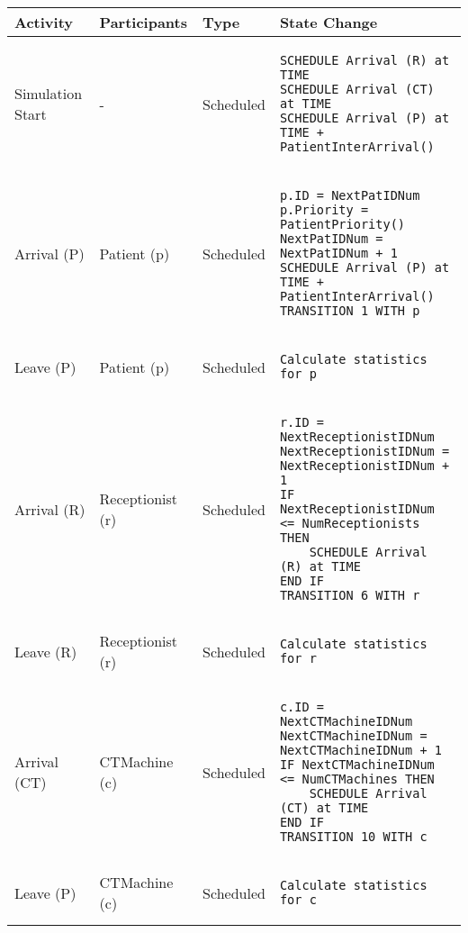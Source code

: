 \begin{tabular}{@{}>{\raggedright\arraybackslash}p{1.5cm}>{\raggedright\arraybackslash}p{2.1cm}>{\raggedright\arraybackslash}p{2.2cm}>{\raggedright\arraybackslash}p{10cm}@{}}
  \toprule
  Activity          & Participants & Type       & State Change \\ \midrule
  Simulation Start & -  & Scheduled  & 
  \vspace{-12pt}
  \begin{lstlisting}[language=CMPseudo]
SCHEDULE Arrival (R) at TIME
SCHEDULE Arrival (CT) at TIME
SCHEDULE Arrival (P) at TIME + PatientInterArrival()
  \end{lstlisting}
  \\ \midrule
  Arrival (P) & Patient (p)  & Scheduled  & 
  \vspace{-12pt}
  \begin{lstlisting}[language=CMPseudo]
p.ID = NextPatIDNum
p.Priority = PatientPriority()
NextPatIDNum = NextPatIDNum + 1
SCHEDULE Arrival (P) at TIME + PatientInterArrival()
TRANSITION 1 WITH p
  \end{lstlisting}
  \\ \midrule
  Leave (P) & Patient (p)  & Scheduled  & 
  \vspace{-12pt}
  \begin{lstlisting}[language=CMPseudo]
Calculate statistics for p
  \end{lstlisting}
  \\ \midrule
  Arrival (R) & Receptionist (r)  & Scheduled  & 
  \vspace{-12pt}
  \begin{lstlisting}[language=CMPseudo]
r.ID = NextReceptionistIDNum
NextReceptionistIDNum = NextReceptionistIDNum + 1
IF NextReceptionistIDNum <= NumReceptionists THEN
    SCHEDULE Arrival (R) at TIME
END IF
TRANSITION 6 WITH r
  \end{lstlisting}
  \\ \midrule
  Leave (R) & Receptionist (r)  & Scheduled  & 
  \vspace{-12pt}
  \begin{lstlisting}[language=CMPseudo]
Calculate statistics for r
  \end{lstlisting}
  \\ \midrule
  Arrival (CT) & CTMachine (c)  & Scheduled  & 
  \vspace{-12pt}
  \begin{lstlisting}[language=CMPseudo]
c.ID = NextCTMachineIDNum
NextCTMachineIDNum = NextCTMachineIDNum + 1
IF NextCTMachineIDNum <= NumCTMachines THEN
    SCHEDULE Arrival (CT) at TIME
END IF
TRANSITION 10 WITH c
  \end{lstlisting}
  \\ \midrule
  Leave (P) & CTMachine (c)  & Scheduled  & 
  \vspace{-12pt}
  \begin{lstlisting}[language=CMPseudo]
Calculate statistics for c
  \end{lstlisting}
  \\ \bottomrule
  \end{tabular}